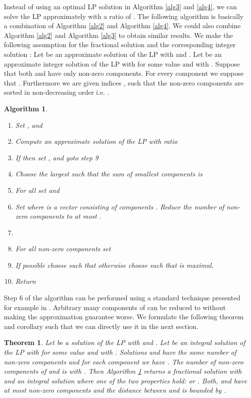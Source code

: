 \documentclass[a4paper,11pt]{article}
\newtheorem{thm}{Theorem}
\newtheorem{algo}{Algorithm}
\begin{document}
Instead of using an optimal LP solution in Algorithm \ref{alg3} and \ref{alg4}, we can solve the LP approximately 
with a ratio of . The following algorithm is basically a combination of Algorithm \ref{alg2} and Algorithm \ref{alg4}.
We could also combine Algorithm \ref{alg2} and Algorithm \ref{alg3} to obtain similar results.
We make the following assumption for the fractional solution  and the corresponding integer solution :
Let  be an approximate solution of the LP  with
 and .
Let  be an approximate integer solution of the LP with  for some value 
 and with . 
Suppose that both  and  have only 
non-zero components. 
For every component  we suppose that .
Furthermore we are given indices , such that the non-zero components  are
sorted in non-decreasing order i.e. .
\newpage
\begin{algo}\label{alg5}
\ 
  \begin{enumerate}
   \item Set ,  and 
   
	\item Compute an approximate solution  of the LP 
	with ratio 
	\item If  then set , 
	 and goto step 9
  \item Choose the largest  such that the sum of smallest components  is 
  
	\item For all  set  
	and 
	\item Set  where  is a vector consisting of components 
	. Reduce the number of non-zero components to at most .
  \item 
  \item For all non-zero components  set 
	\item If possible choose  such that  otherwise
  choose  such that  is maximal.
  \item Return 
  \end{enumerate}
\end{algo}
Step 6 of the algorithm can be performed using a standard technique presented for example in \cite{beling1998}. 
Arbitrary many components of 
 can be reduced to  without making the approximation guarantee worse.
We formulate the following theorem and corollary such that we can directly use it in the next section.
\begin{thm}\label{thm8}
	Let  be a solution of the LP with  and . Let  be an integral
	 solution of the LP with  for some value 
	 and with .
	 Solutions  and  have the same number of non-zero components and for each component we have 
	 . The number of non-zero components of  and  is  with .
	Then Algorithm \ref{alg5} returns a fractional solution  with 
	 and an integral solution
	 where one of the two properties hold:
	  or . 
	 Both,  and  have at most 
	non-zero components and the distance between  and  is bounded by .
\end{thm}
\end{document}
